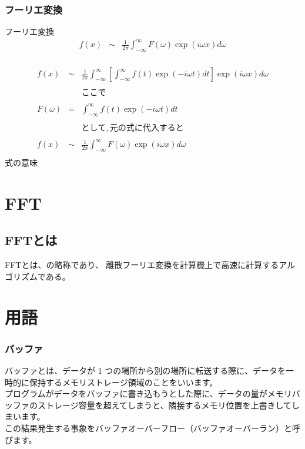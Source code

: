 \documentclass[a4paper]{jsarticle}
\begin{document}
\subsubsection{フーリエ変換}
\begin{itembox}[l]{フーリエ変換}
    \begin{eqnarray*}
        f\left(x\right) &\sim& \frac{1}{2\pi}\int^{\infty}_{-\infty} F\left(\omega\right) \exp \left(i\omega x\right) d\omega\\
    \end{eqnarray*}
\end{itembox}
\begin{eqnarray*}
    f\left(x\right) &\sim& \frac{1}{2\pi}\int^{\infty}_{-\infty}\left[\int^{\infty}_{-\infty}f\left(t\right)\exp \left(-i \omega t\right)dt\right] \exp \left(i\omega x\right) d\omega\\
    \\
    &&ここで\\
    \\
    F\left(\omega\right) &=& \int^{\infty}_{-\infty}f\left(t\right)\exp \left(-i \omega t\right)dt \\
    \\
    &&として,元の式に代入すると\\
    \\
    f\left(x\right) &\sim& \frac{1}{2\pi}\int^{\infty}_{-\infty} F\left(\omega\right) \exp \left(i\omega x\right) d\omega\\
\end{eqnarray*}
式の意味
\section{FFT}
\subsection{FFTとは}
FFTとは、の略称であり、
離散フーリエ変換を計算機上で高速に計算するアルゴリズムである。

\section{用語}
\subsubsection*{バッファ}
バッファとは、データが 1 つの場所から別の場所に転送する際に、データを一時的に保持するメモリストレージ領域のことをいいます。\\
プログラムがデータをバッファに書き込もうとした際に、データの量がメモリバッファのストレージ容量を超えてしまうと、隣接するメモリ位置を上書きしてしまいます。\\
この結果発生する事象をバッファオーバーフロー（バッファオーバーラン）と呼びます。\\
\end{document}
